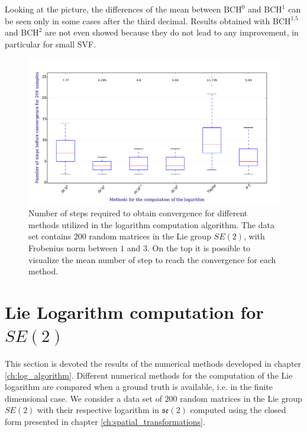 Looking at the picture, the differences of the mean between $\text{BCH}^0$ and $\text{BCH}^{1}$ can be seen only in some cases after the third decimal. Results obtained with $\text{BCH}^{1.5}$ and $\text{BCH}^2$ are not even showed because they do not lead to any improvement, in particular for small SVF. 

\begin{figure}[!ht]
	\centering
	\includegraphics[scale=0.48]{figures/log_computation_boxplot.pdf}
	\caption{Number of steps required to obtain convergence for different methods utilized in the logarithm computation algorithm. The data set contains $200$ random matrices in the Lie group $SE(2)$, with Frobenius norm between $1$ and $3$. On the top it is possible to visualize the mean number of step to reach the convergence for each method.}
	\label{fig:log_computation_boxplot}
\end{figure}

\section{Lie Logarithm computation for $SE(2)$}\label{se:results_lie_logarithm_computations}

This section is devoted the results of the numerical methods developed in chapter \ref{ch:log_algorithm}. Different numerical methods for the computation of the Lie logarithm are compared when a ground truth is available, i.e. in the finite dimensional case. We consider a data set of $200$ random matrices in the Lie group $SE(2)$ with their respective logarithm in $\mathfrak{se}(2)$ computed using the closed form presented in chapter \ref{ch:spatial_transformations}. 

